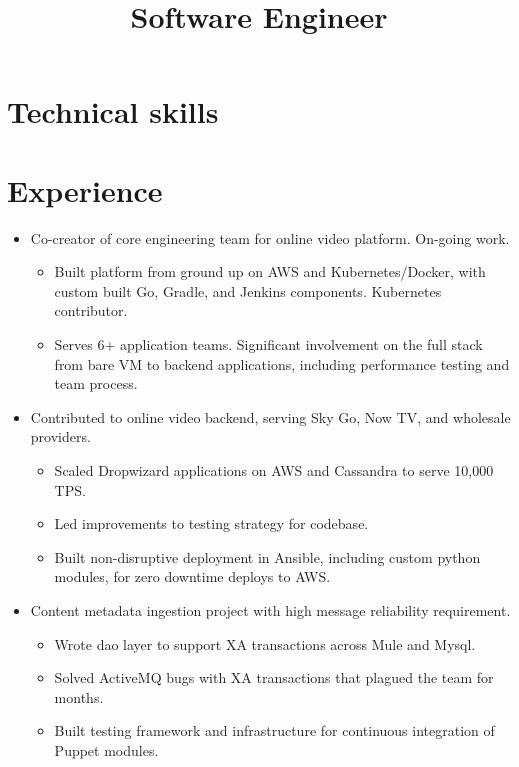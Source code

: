 \documentclass[11pt,a4paper,roman]{moderncv}
\title{Software Engineer}
\begin{document}
\makecvtitle

\section{Technical skills}

\section{Experience}

\begin{itemize}
\item Co-creator of core engineering team for online video platform. On-going work.
  \begin{itemize}
  \item Built platform from ground up on AWS and Kubernetes/Docker, with custom built Go, Gradle, and Jenkins components. Kubernetes contributor.
  \item Serves 6+ application teams. Significant involvement on the full stack from bare VM to backend applications, including performance testing and team process.
  \end{itemize}
\item Contributed to online video backend, serving Sky Go, Now TV, and wholesale providers.
  \begin{itemize}
  \item Scaled Dropwizard applications on AWS and Cassandra to serve 10,000 TPS.
  \item Led improvements to testing strategy for codebase.
  \item Built non-disruptive deployment in Ansible, including custom python modules, for zero downtime deploys to AWS.
  \end{itemize}
\item Content metadata ingestion project with high message reliability requirement.
  \begin{itemize}
  \item Wrote dao layer to support XA transactions across Mule and Mysql.
  \item Solved ActiveMQ bugs with XA transactions that plagued the team for months.
  \item Built testing framework and infrastructure for continuous integration of Puppet modules.
  \end{itemize}
\end{itemize}
\end{document}
